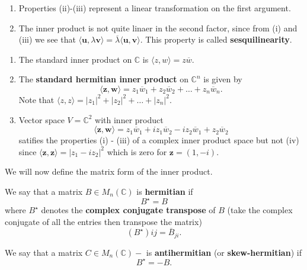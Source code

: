 \begin{remark}
    \begin{enumerate}
        \item Properties (ii)-(iii) represent a linear transformation on the first argument.
        \item The inner product is not quite linaer in the second factor, since from (i) and (iii) we see that $\langle \bm{u}, \lambda \bm{v} \rangle = \overline{\lambda} \langle \bm{u}, \bm{v} \rangle$. This property is called \textbf{sesquilinearity}.
    \end{enumerate}
\end{remark}

\begin{example}
    \begin{enumerate}
        \item The standard inner product on $\mathbb{C}$ is $\langle z, w \rangle = z \overline{w}$.
        \item The \textbf{standard hermitian inner product} on $\mathbb{C}^n$ is given by \[ \langle \bm{z}, \bm{w} \rangle = z_1 \overline{w}_1 + z_2 \overline{w}_2 + \ldots + z_n \overline{w}_n. \] Note that $\langle z, z \rangle = |z_1|^2 + |z_2|^2 + \ldots + |z_n|^2$.
        \item Vector space $V = \mathbb{C}^2$ with inner product \[ \langle \bm{z}, \bm{w} \rangle = z_1 \overline{w}_1 + i z_1 \overline{w}_2 - i z_2 \overline{w}_1 + z_2 \overline{w}_2 \] satifies the properties (i) - (iii) of a complex inner product space but not (iv) since $\langle \bm{z}, \bm{z} \rangle = | z_1 - i z_2 |^2$ which is zero for $\bm{z} = (1, -i)$.
    \end{enumerate}
\end{example}

We will now define the matrix form of the inner product.

\begin{definition}
    We say that a matrix $B \in M_n(\mathbb C)$ is \textbf{hermitian} if \[ B^\star = B \] where $B^\star$ denotes the \textbf{complex conjugate transpose} of $B$ (take the complex conjugate of all the entries then transpose the matrix) \[ (B^\star){ij} = \overline{B}_{ji}. \]
\end{definition}

\begin{definition} 
    We say that a matrix $C \in M_n(\mathbb C)-$ is \textbf{antihermitian} (or \textbf{skew-hermitian}) if \[ B^\star = -B. \]
\end{definition}

